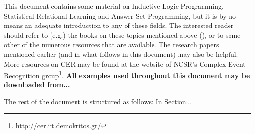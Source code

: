 This document contains some material on Inductive Logic Programming, Statistical Relational Learning and Answer Set Programming, but it is by no means an adequate introduction to any of these fields. The interested reader should refer to (e.g.) the books on these topics mentioned above (\cite{de2008logical,raedt2016statistical,lifschitz2019answer}), or to some other of the numerous resources that are available. The research papers mentioned earlier (and in what follows in this document) may also be helpful. More resources on CER may be found at the website of NCSR's Complex Event Recognition group\footnote{\url{http://cer.iit.demokritos.gr/}}. \textbf{All examples used throughout this document may be downloaded from...}  

The rest of the document is structured as follows: In Section...

